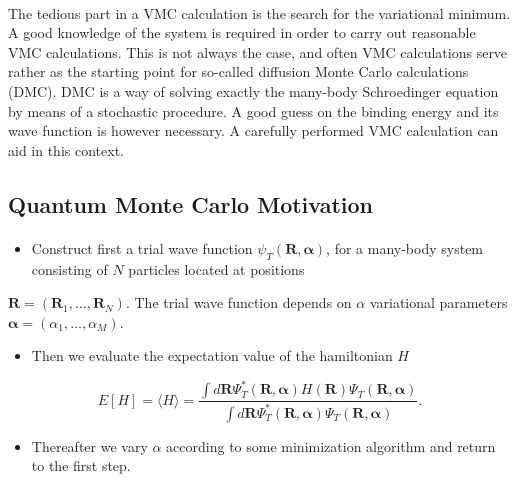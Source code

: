 \documentclass[%
twoside,                 %
final,                   %
10pt]{article}
\begin{document}
\paragraph{}
The tedious part in a VMC calculation is the search for the variational
minimum. A good knowledge of the system is required in order to carry out
reasonable VMC calculations. This is not always the case, 
and often VMC calculations 
serve rather as the starting
point for so-called diffusion Monte Carlo calculations (DMC). DMC is a way of
solving exactly the many-body Schroedinger equation by means of 
a stochastic procedure. A good guess on the binding energy
and its wave function is however necessary. 
A carefully performed VMC calculation can aid in this context.




\subsection*{Quantum Monte Carlo Motivation}

\paragraph{}
\begin{itemize}
\item Construct first a trial wave function $\psi_T(\bm{R},\bm{\alpha})$,  for a many-body system consisting of $N$ particles located at positions 
\end{itemize}

\noindent
$\bm{R}=(\bm{R}_1,\dots ,\bm{R}_N)$. The trial wave function depends on $\alpha$ variational parameters $\bm{\alpha}=(\alpha_1,\dots ,\alpha_M)$.
\begin{itemize}
\item Then we evaluate the expectation value of the hamiltonian $H$ 
\end{itemize}

\noindent
\[
   E[H]=\langle H \rangle =
   \frac{\int d\bm{R}\Psi^{\ast}_{T}(\bm{R},\bm{\alpha})H(\bm{R})\Psi_{T}(\bm{R},\bm{\alpha})}
        {\int d\bm{R}\Psi^{\ast}_{T}(\bm{R},\bm{\alpha})\Psi_{T}(\bm{R},\bm{\alpha})}.
\]
\begin{itemize}
\item Thereafter we vary $\alpha$ according to some minimization algorithm and return to the first step.
\end{itemize}
\end{document}
